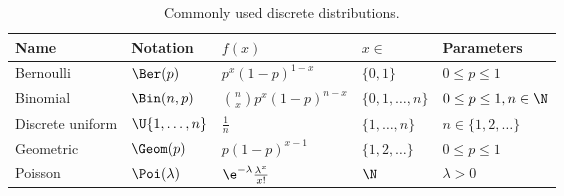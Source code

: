 \begin{table}[H]
	\centering
	\caption{Commonly used discrete distributions.}
	\label{tab:DiscreteDistributions}
	\renewcommand{\arraystretch}{1.5}
	\begin{tabular}{@{}lllll@{}}
		\toprule
		Name             & Notation            & $f(x)$                              & $x \in$              & Parameters                \\
		\midrule
		Bernoulli        & $\Ber(p)$           & $p^x(1-p)^{1-x}$                    & $\{0, 1\}$           & $0 \le p \le 1$           \\
		Binomial         & $\Bin(n, p)$        & $\binom{n}{x}p^x(1-p)^{n-x}$        & $\{0, 1, \dots, n\}$ & $0 \le p \le 1, n \in \N$ \\
		Discrete uniform & $\U\{1, \dots, n\}$ & $\frac{1}{n}$                       & $\{1, \dots, n\}$    & $n \in \{1, 2, \dots\}$   \\
		Geometric        & $\Geom(p)$          & $p(1-p)^{x-1}$                      & $\{1, 2, \dots\}$    & $0 \le p \le 1$           \\
		Poisson          & $\Poi(\lambda)$     & $\e^{-\lambda}\frac{\lambda^x}{x!}$ & $\N$                 & $\lambda > 0$             \\
		\bottomrule
	\end{tabular}
\end{table}

